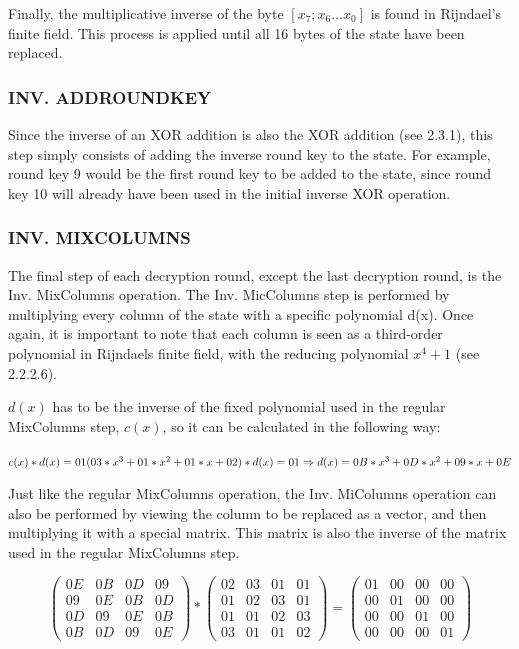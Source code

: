 \documentclass[12pt]{report}
\theoremstyle{definition}
\theoremstyle{remark}
\begin{document}
Finally, the multiplicative inverse of the byte $[x_7;x_6...x_0]$ is found in Rijndael's finite field. This process is applied until all 16 bytes of the state have been replaced.

\subsubsection{INV. ADDROUNDKEY}
Since the inverse of an XOR addition is also the XOR addition (see 2.3.1), this step simply consists of adding the inverse round key to the state. For example, round key 9 would be the first round key to be added to the state, since round key 10 will already have been used in the initial inverse XOR operation\cite{RoundKeyInverse}.

\subsubsection{INV. MIXCOLUMNS}
The final step of each decryption round, except the last decryption round, is the Inv. MixColumns operation. The Inv. MicColumns step is performed by multiplying every column of the state with a specific polynomial d(x)\cite{Rijndael}. Once again, it is important to note that each column is seen as a third-order polynomial in Rijndaels finite field, with the reducing polynomial $x^4+1$ (see 2.2.2.6).

$d(x)$ has to be the inverse of the fixed polynomial used in the regular MixColumns step, $c(x)$, so it can be calculated in the following way:

\noindent
$c(x)*d(x)=01 \\
(03*x^3+01*x^2+01*x+02)*d(x)=01 \\
\Rightarrow d(x)=0B*x^3+0D*x^2+09*x+0E$

Just like the regular MixColumns operation, the Inv. MiColumns operation can also be performed by viewing the column to be replaced as a vector, and then multiplying it with a special matrix. This matrix is also the inverse of the matrix used in the regular MixColumns step.

\[ \left( \begin{array}{cccc}
0E & 0B & 0D & 09 \\
09 & 0E & 0B & 0D \\
0D & 09 & 0E & 0B \\
0B & 0D & 09 & 0E\end{array} \right)
*
\left( \begin{array}{cccc}
02 & 03 & 01 & 01 \\
01 & 02 & 03 & 01 \\
01 & 01 & 02 & 03 \\
03 & 01 & 01 & 02\end{array} \right)
=
\left( \begin{array}{cccc}
01 & 00 & 00 & 00 \\
00 & 01 & 00 & 00 \\
00 & 00 & 01 & 00 \\
00 & 00 & 00 & 01\end{array} \right)
\]
\end{document}
